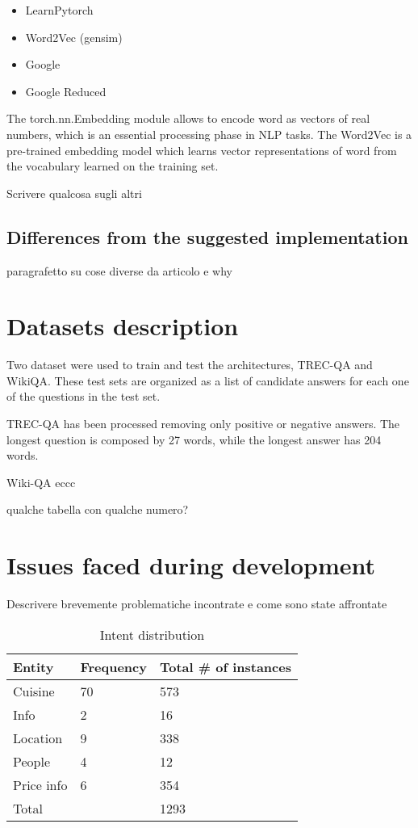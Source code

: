 \documentclass[11pt,a4paper]{article}
\begin{document}
\begin{itemize}
    \item LearnPytorch
    \item Word2Vec (gensim)
    \item Google
    \item Google Reduced
\end{itemize}

The torch.nn.Embedding module allows to encode word as vectors of real numbers, which is an essential processing phase in NLP tasks. 
The Word2Vec is a pre-trained embedding model which learns vector representations of word from the vocabulary learned on the training set.

Scrivere qualcosa sugli altri

\subsection{Differences from the suggested implementation}
paragrafetto su cose diverse da articolo e why

\section{Datasets description}
Two dataset were used to train and test the architectures, TREC-QA and WikiQA. These test sets are organized as a list of candidate answers for each one of the questions in the test set.

TREC-QA has been processed removing only positive or negative answers. The longest question is composed by 27 words, while the longest answer has 204 words. 

Wiki-QA eccc

qualche tabella con qualche numero?

\section{Issues faced during development}
Descrivere brevemente problematiche incontrate e come sono state affrontate 



\begin{table}[t!]
\begin{center}
\begin{tabular}{|l|l|l|}
\hline \bf Entity & \bf Frequency & \bf Total \# of instances \\ \hline
Cuisine & 70 & 573\\
Info & 2 & 16\\
Location & 9 & 338\\
People & 4 & 12\\
Price info & 6 & 354\\
Total &  & 1293\\
\hline
\end{tabular}
\end{center}
\caption{\label{font-table} Intent distribution }
\end{table}
\end{document}
